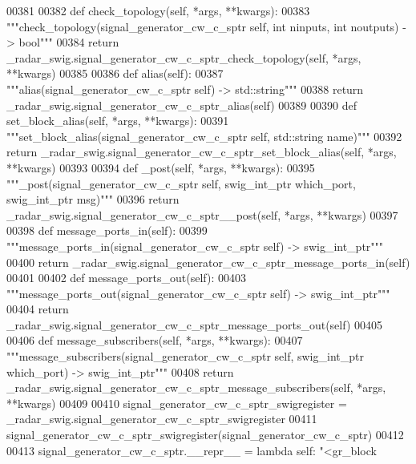 \begin{DoxyCode}
{{{00381 
00382     \textcolor{keyword}{def }check_topology(self, *args, **kwargs):
00383         \textcolor{stringliteral}{"""check\_topology(signal\_generator\_cw\_c\_sptr self, int ninputs, int noutputs) -> bool"""}
00384         \textcolor{keywordflow}{return} \_radar\_swig.signal\_generator\_cw\_c\_sptr\_check\_topology(self, *args, **kwargs)
00385 
00386     \textcolor{keyword}{def }alias(self):
00387         \textcolor{stringliteral}{"""alias(signal\_generator\_cw\_c\_sptr self) -> std::string"""}
00388         \textcolor{keywordflow}{return} \_radar\_swig.signal\_generator\_cw\_c\_sptr\_alias(self)
00389 
00390     \textcolor{keyword}{def }set_block_alias(self, *args, **kwargs):
00391         \textcolor{stringliteral}{"""set\_block\_alias(signal\_generator\_cw\_c\_sptr self, std::string name)"""}
00392         \textcolor{keywordflow}{return} \_radar\_swig.signal\_generator\_cw\_c\_sptr\_set\_block\_alias(self, *args, **kwargs)
00393 
00394     \textcolor{keyword}{def }_post(self, *args, **kwargs):
00395         \textcolor{stringliteral}{"""\_post(signal\_generator\_cw\_c\_sptr self, swig\_int\_ptr which\_port, swig\_int\_ptr msg)"""}
00396         \textcolor{keywordflow}{return} \_radar\_swig.signal\_generator\_cw\_c\_sptr\_\_post(self, *args, **kwargs)
00397 
00398     \textcolor{keyword}{def }message_ports_in(self):
00399         \textcolor{stringliteral}{"""message\_ports\_in(signal\_generator\_cw\_c\_sptr self) -> swig\_int\_ptr"""}
00400         \textcolor{keywordflow}{return} \_radar\_swig.signal\_generator\_cw\_c\_sptr\_message\_ports\_in(self)
00401 
00402     \textcolor{keyword}{def }message_ports_out(self):
00403         \textcolor{stringliteral}{"""message\_ports\_out(signal\_generator\_cw\_c\_sptr self) -> swig\_int\_ptr"""}
00404         \textcolor{keywordflow}{return} \_radar\_swig.signal\_generator\_cw\_c\_sptr\_message\_ports\_out(self)
00405 
00406     \textcolor{keyword}{def }message_subscribers(self, *args, **kwargs):
00407         \textcolor{stringliteral}{"""message\_subscribers(signal\_generator\_cw\_c\_sptr self, swig\_int\_ptr which\_port) -> swig\_int\_ptr"""}
00408         \textcolor{keywordflow}{return} \_radar\_swig.signal\_generator\_cw\_c\_sptr\_message\_subscribers(self, *args, **kwargs)
00409 
00410 signal\_generator\_cw\_c\_sptr\_swigregister = \_radar\_swig.signal\_generator\_cw\_c\_sptr\_swigregister
00411 signal_generator_cw_c_sptr_swigregister(signal\_generator\_cw\_c\_sptr)
00412 
00413 signal\_generator\_cw\_c\_sptr.\_\_repr\_\_ = \textcolor{keyword}{lambda} self: \textcolor{stringliteral}{"<gr\_block %
}}}}
\end{DoxyCode}
